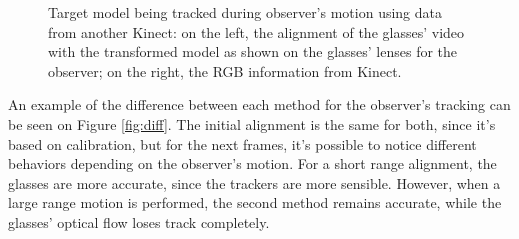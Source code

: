 \documentclass[msc, a4paper, classic, en]{ufbathesis}
\begin{document}
\begin{figure}
\centering
{}
\caption{Target model being tracked during observer's motion using data from another Kinect: on the left, the alignment of the glasses' video with the transformed model as shown on the glasses' lenses for the observer; on the right, the RGB information from Kinect.}
\label{fig:method2}
\end{figure}

An example of the difference between each method for the observer's tracking can be seen on Figure \ref{fig:diff}. The initial alignment is the same for both, since it's based on calibration, but for the next frames, it's possible to notice different behaviors depending on the observer's motion. For a short range alignment, the glasses are more accurate, since the trackers are more sensible. However, when a large range motion is performed, the second method remains accurate, while the glasses' optical flow loses track completely.
\end{document}
